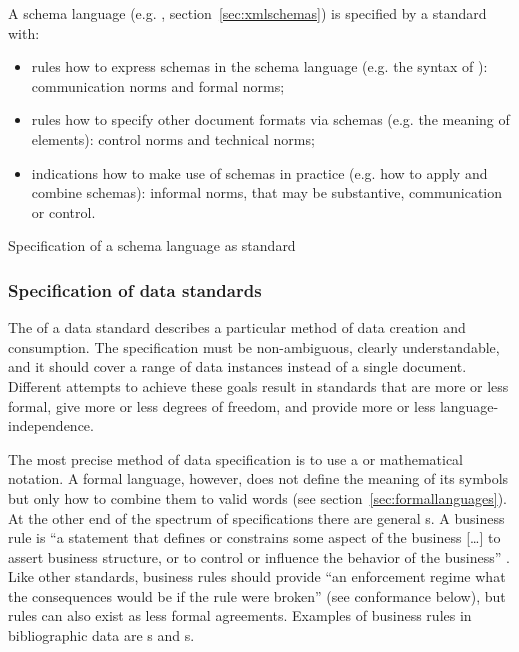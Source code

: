 \begin{example}
A schema language (e.g. , section~\ref{sec:xmlschemas}) is 
specified by a standard with:
\begin{itemize}
	\item rules how to express schemas in the schema language (e.g.
		the syntax of ): communication norms and formal norms;
	\item rules how to specify other document formats via schemas
		(e.g. the meaning of  elements):
 		control norms and technical norms;
	\item indications how to make use of schemas in practice
		(e.g. how to apply and combine  schemas):
	    informal norms, that may be substantive, communication or control.
\end{itemize}
\caption{Specification of a schema language as standard}
\label{tab:sstspec}
\end{example}

\subsubsection{Specification of data standards}
\label{sec:dsspec}

The  of a data standard describes a particular method of
data creation and consumption. The specification must be non-ambiguous, clearly
understandable, and it should cover a range of data instances instead of a
single document. Different attempts to achieve these goals result in standards
that are more or less formal, give more or less degrees of freedom, and provide
more or less language-independence.

The most precise method of data specification is to use a  or mathematical notation.  A formal language, however, does not
define the meaning of its symbols but only how to combine them to valid words
(see section~\ref{sec:formallanguages}).  At the other end of the
spectrum of specifications there are general s. A business
rule is ``a statement that defines or constrains some aspect of the business
[\ldots] to assert business structure, or to control or influence the behavior
of the business'' \cite{BRG2011}. Like other standards, business rules should
provide ``an enforcement regime what the consequences would be if the rule were
broken'' (see conformance below), but rules can also exist as less formal
agreements.  Examples of business rules in bibliographic data are
s and s. 

